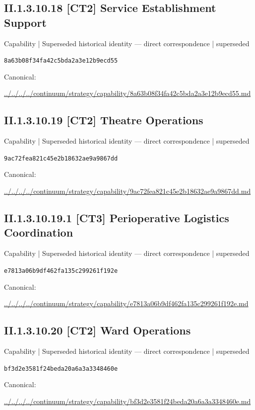 \documentclass[10pt,a4paper]{article}
\begin{document}
\subsection*{II.1.3.10.18 [CT2] Service Establishment Support}
{\small Capability | Superseded historical identity — direct correspondence | superseded}\par
\texttt{8a63b08f34fa42c5bda2a3e12b9ecd55}\par
Canonical: \par
{\footnotesize\url{../../../../continuum/strategy/capability/8a63b08f34fa42c5bda2a3e12b9ecd55.md}}\par
\subsection*{II.1.3.10.19 [CT2] Theatre Operations}
{\small Capability | Superseded historical identity — direct correspondence | superseded}\par
\texttt{9ac72fea821c45e2b18632ae9a9867dd}\par
Canonical: \par
{\footnotesize\url{../../../../continuum/strategy/capability/9ac72fea821c45e2b18632ae9a9867dd.md}}\par
\subsection*{II.1.3.10.19.1 [CT3] Perioperative Logistics Coordination}
{\small Capability | Superseded historical identity — direct correspondence | superseded}\par
\texttt{e7813a06b9df462fa135c299261f192e}\par
Canonical: \par
{\footnotesize\url{../../../../continuum/strategy/capability/e7813a06b9df462fa135c299261f192e.md}}\par
\subsection*{II.1.3.10.20 [CT2] Ward Operations}
{\small Capability | Superseded historical identity — direct correspondence | superseded}\par
\texttt{bf3d2e3581f24beda20a6a3a3348460e}\par
Canonical: \par
{\footnotesize\url{../../../../continuum/strategy/capability/bf3d2e3581f24beda20a6a3a3348460e.md}}\par
\end{document}
